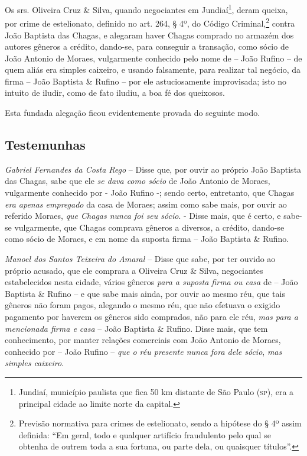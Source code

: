 {\asterisc{}

Os srs. Oliveira Cruz \& Silva, quando negociantes em
Jundiaí\footnote{ Jundiaí, município paulista que fica 50 km distante
  de São Paulo (\textsc{sp}), era a principal cidade ao limite norte da capital.},
deram queixa, por crime de estelionato, definido no art. 264, § 4º, do
Código Criminal,\footnote{ Previsão normativa para crimes de
  estelionato, sendo a hipótese do § 4º assim definida: ``Em geral, todo
  e qualquer artifício fraudulento pelo qual se obtenha de outrem toda a
  sua fortuna, ou parte dela, ou quaisquer títulos''.} contra João
Baptista das Chagas, e alegaram haver Chagas comprado no armazém dos
autores gêneros a crédito, dando-se, para conseguir a transação, como
sócio de João Antonio de Moraes, vulgarmente conhecido pelo nome de --
João Rufino -- de quem aliás era simples caixeiro, e usando falsamente,
para realizar tal negócio, da firma -- João Baptista \& Rufino -- por
ele astuciosamente improvisada; isto no intuito de iludir, como de fato
iludiu, a boa fé dos queixosos.

Esta fundada alegação ficou evidentemente provada do seguinte modo.

\subsection{Testemunhas}

\emph{Gabriel Fernandes da Costa Rego} -- Disse que, por ouvir ao
próprio João Baptista das Chagas, sabe que ele \emph{se dava como sócio}
de João Antonio de Moraes, vulgarmente conhecido por - João Rufino -;
sendo certo, entretanto, que Chagas \emph{era apenas empregado} da casa
de Moraes; assim como sabe mais, por ouvir ao referido Moraes, \emph{que
Chagas nunca foi seu sócio}. - Disse mais, que é certo, e sabe-se
vulgarmente, que Chagas comprava gêneros a diversos, a crédito, dando-se
como sócio de Moraes, e em nome da suposta firma -- João Baptista \&
Rufino.

\emph{Manoel dos Santos Teixeira do Amaral} -- Disse que sabe, por ter
ouvido ao próprio acusado, que ele comprara a Oliveira Cruz \& Silva,
negociantes estabelecidos nesta cidade, vários gêneros \emph{para a
suposta firma ou casa} de -- João Baptista \& Rufino -- e que sabe mais
ainda, por ouvir ao mesmo réu, que tais gêneros não foram pagos,
alegando o mesmo réu, que não efetuava o exigido pagamento por haverem
os gêneros sido comprados, não para ele réu, \emph{mas para a mencionada
firma e casa} -- João Baptista \& Rufino. Disse mais, que tem
conhecimento, por manter relações comerciais com João Antonio de Moraes,
conhecido por -- João Rufino -- \emph{que o réu presente nunca fora dele
sócio}, \emph{mas simples caixeiro}.

}
